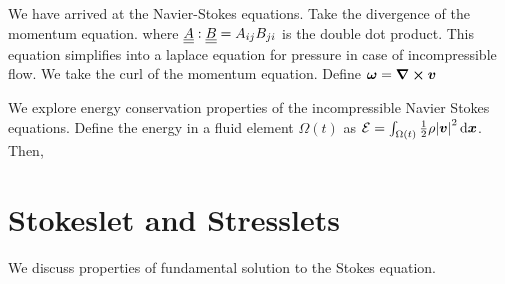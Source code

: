 We have arrived at the Navier-Stokes equations.
Take the divergence of the momentum equation.
where $\underline{\underline{A}}:\underline{\underline{B}}=A_{ij}B_{ji}$ is the double dot product. This equation simplifies into a laplace equation for pressure in case of incompressible flow.
We take the curl of the momentum equation. Define $\boldsymbol{\omega}=\boldsymbol{\nabla}\cross\boldsymbol{v}$

We explore energy conservation properties of the incompressible Navier Stokes equations. Define the energy in a fluid element $\Omega(t)$ as $\mathcal{E}=\int_{\Omega(t)}\frac{1}{2}\rho\abs{\boldsymbol{v}}^2\,\mathrm{d}\boldsymbol{x}$. Then,


\section{Stokeslet and Stresslets}
We discuss properties of fundamental solution to the Stokes equation.
